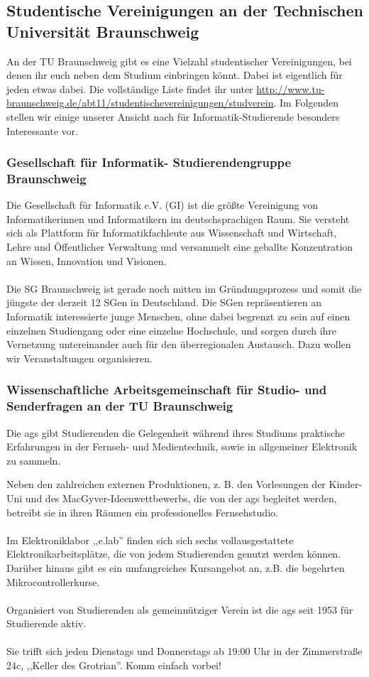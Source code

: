 \subsection{Studentische Vereinigungen an der Technischen Universität
Braunschweig}
\label{vereinigungen}
	An der TU Braunschweig gibt es eine Vielzahl studentischer
	Vereinigungen, bei denen ihr euch neben dem Studium einbringen
	könnt. Dabei ist eigentlich für jeden etwas dabei. Die
	vollständige Liste findet ihr unter 
	\url{http://www.tu-braunschweig.de/abt11/studentischevereinigungen/studverein}. 
	Im Folgenden stellen wir einige unserer Ansicht nach für
	Informatik-Studierende besonders Interessante vor.

	\subsubsection{Gesellschaft für Informatik- Studierendengruppe
	Braunschweig}	
	Die Gesellschaft für Informatik e.V. (GI) ist die größte
	Vereinigung von Informatikerinnen und Informatikern im
	deutschsprachigen Raum. Sie versteht sich als Plattform für
	Informatikfachleute aus Wissenschaft und Wirtschaft, Lehre und
	Öffentlicher Verwaltung und versammelt eine geballte
	Konzentration an Wissen, Innovation und Visionen. \\\\
	 Die SG Braunschweig ist gerade noch mitten im Gründungsprozess
	 und somit die jüngste der derzeit 12 SGen in Deutschland. Die
	 SGen repräsentieren an Informatik interessierte junge Menschen,
	 ohne dabei begrenzt zu sein auf einen einzelnen Studiengang
	 oder eine einzelne Hochschule, und sorgen durch ihre Vernetzung
	 untereinander auch für den überregionalen Austausch. Dazu
	 wollen wir Veranstaltungen organisieren. 

\subsubsection{Wissenschaftliche Arbeitsgemeinschaft für Studio- und Senderfragen an der TU Braunschweig}
Die ags gibt Studierenden die Gelegenheit während ihres Studiums
praktische Erfahrungen in der Fernseh- und Medientechnik, sowie in
allgemeiner Elektronik zu sammeln. 


Neben den zahlreichen externen Produktionen, z.
B. den Vorlesungen der Kinder-Uni und des MacGyver-Ideenwettbewerbs, die
von der ags begleitet werden, betreibt sie in ihren Räumen 
ein professionelles Fernsehstudio. 
\\\\
 Im Elektroniklabor ,,e.lab'' finden sich sich sechs
 vollausgestattete Elektronikarbeitsplätze, die von jedem Studierenden
 genutzt werden können. Darüber hinaus gibt es ein umfangreiches
 Kursangebot an, z.B. die begehrten Mikrocontrollerkurse. 
\\\\
  Organisiert von Studierenden als gemeinnütziger Verein ist die ags
  seit 1953 für Studierende aktiv. 
  \\\\
   Sie trifft sich jeden Dienstags und Donnerstags ab 19:00 Uhr in der
   Zimmerstraße 24c, ,,Keller des Grotrian''. Komm einfach vorbei!

